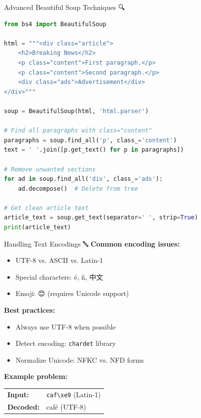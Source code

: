 \documentclass[aspectratio=169]{beamer}
\begin{document}
\begin{frame}[fragile]{Advanced Beautiful Soup Techniques 🔍}
    \begin{lstlisting}[language=Python]
from bs4 import BeautifulSoup

html = """<div class="article">
    <h2>Breaking News</h2>
    <p class="content">First paragraph.</p>
    <p class="content">Second paragraph.</p>
    <div class="ads">Advertisement</div>
</div>"""

soup = BeautifulSoup(html, 'html.parser')

# Find all paragraphs with class="content"
paragraphs = soup.find_all('p', class_='content')
text = ' '.join([p.get_text() for p in paragraphs])

# Remove unwanted sections
for ad in soup.find_all('div', class_='ads'):
    ad.decompose()  # Delete from tree

# Get clean article text
article_text = soup.get_text(separator=' ', strip=True)
print(article_text)
    \end{lstlisting}
\end{frame}

\begin{frame}[shrink=10]{Handling Text Encodings 🔤}
    \textbf{Common encoding issues:}

    \begin{itemize}\setlength{\itemsep}{0pt}
        \item UTF-8 vs. ASCII vs. Latin-1
        \item Special characters: é, ñ, 中文
        \item Emoji: 😊 (requires Unicode support)
    \end{itemize}

    \vspace{0.5em}
    \textbf{Best practices:}
    \begin{itemize}\setlength{\itemsep}{0pt}
        \item Always use UTF-8 when possible
        \item Detect encoding: \texttt{chardet} library
        \item Normalize Unicode: NFKC vs. NFD forms
    \end{itemize}

    \vspace{0.5em}
    \textbf{Example problem:}
    \begin{center}
        \begin{tabular}{ll}
            \textbf{Input:} & \texttt{caf\textbackslash xe9} (Latin-1) \\
            \textbf{Decoded:} & café (UTF-8) \\
        \end{tabular}
    \end{center}
\end{frame}
\end{document}

